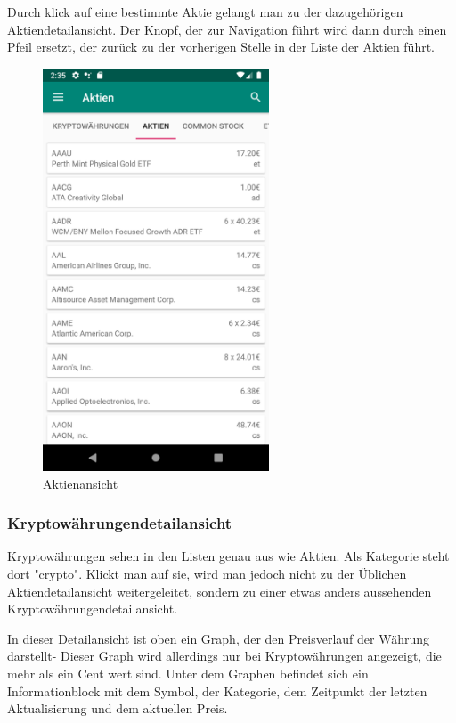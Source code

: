 \documentclass[10pt]{scrartcl}
\begin{document}
Durch klick auf eine bestimmte Aktie gelangt man zu der dazugehörigen Aktiendetailansicht. Der Knopf, der zur Navigation führt wird dann durch einen Pfeil ersetzt, der zurück zu der vorherigen Stelle in der Liste der Aktien führt.

\begin{figure}[H]
	\centering
	\includegraphics[width=0.6\textwidth]{Bilder/Applikation/Aktien.png}
	\caption{Aktienansicht}
\end{figure}

\subsubsection{Kryptowährungendetailansicht}

Kryptowährungen sehen in den Listen genau aus wie Aktien. Als Kategorie steht dort "crypto". Klickt man auf sie, wird man jedoch nicht zu der Üblichen Aktiendetailansicht weitergeleitet, sondern zu einer etwas anders aussehenden Kryptowährungendetailansicht.

In dieser Detailansicht ist oben ein Graph, der den Preisverlauf der Währung darstellt- Dieser Graph wird allerdings nur bei Kryptowährungen angezeigt, die mehr als ein Cent wert sind. Unter dem Graphen befindet sich ein Informationblock mit dem Symbol, der Kategorie, dem Zeitpunkt der letzten Aktualisierung und dem aktuellen Preis.
\end{document}
